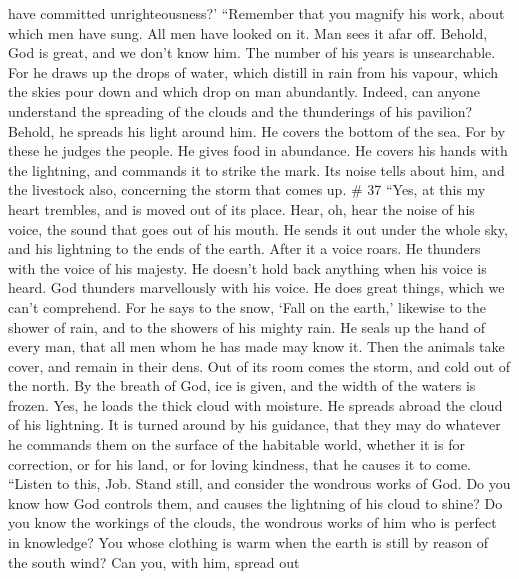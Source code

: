 have committed unrighteousness?'  ``Remember that you
magnify his work, about which men have sung.  All men have
looked on it. Man sees it afar off.  Behold, God is great,
and we don't know him. The number of his years is unsearchable.
 For he draws up the drops of water, which distill in rain
from his vapour,  which the skies pour down and which drop
on man abundantly.  Indeed, can anyone understand the
spreading of the clouds and the thunderings of his pavilion?
 Behold, he spreads his light around him. He covers the
bottom of the sea.  For by these he judges the people. He
gives food in abundance.  He covers his hands with the
lightning, and commands it to strike the mark.  Its noise
tells about him, and the livestock also, concerning the storm that comes
up. \# 37  ``Yes, at this my heart trembles, and is moved
out of its place.  Hear, oh, hear the noise of his voice,
the sound that goes out of his mouth.  He sends it out under
the whole sky, and his lightning to the ends of the earth. 
After it a voice roars. He thunders with the voice of his majesty. He
doesn't hold back anything when his voice is heard.  God
thunders marvellously with his voice. He does great things, which we
can't comprehend.  For he says to the snow, `Fall on the
earth,' likewise to the shower of rain, and to the showers of his mighty
rain.  He seals up the hand of every man, that all men whom
he has made may know it.  Then the animals take cover, and
remain in their dens.  Out of its room comes the storm, and
cold out of the north.  By the breath of God, ice is given,
and the width of the waters is frozen.  Yes, he loads the
thick cloud with moisture. He spreads abroad the cloud of his lightning.
 It is turned around by his guidance, that they may do
whatever he commands them on the surface of the habitable world,
 whether it is for correction, or for his land, or for
loving kindness, that he causes it to come.  ``Listen to
this, Job. Stand still, and consider the wondrous works of God.
 Do you know how God controls them, and causes the
lightning of his cloud to shine?  Do you know the workings
of the clouds, the wondrous works of him who is perfect in knowledge?
 You whose clothing is warm when the earth is still by
reason of the south wind?  Can you, with him, spread out
